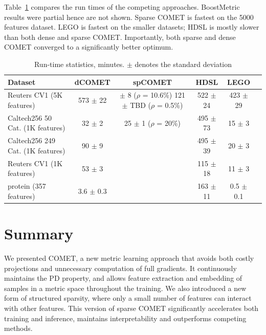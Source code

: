 \documentclass[twoside,11pt]{article}
\newcommand{\tabref}[1]{Table~\ref{#1}}
\begin{document}
\tabref{runtimes} compares the run times of the competing approaches. BoostMetric results were partial hence are not shown. Sparse COMET is fastest on the 5000 features dataset. LEGO is fastest on the smaller datasets; HDSL is mostly slower than both dense and sparse COMET. Importantly, both sparse and dense COMET converged to a significantly better optimum.


\begin{table}[t]
\captionsetup{font=small}
\caption{Run-time statistics, minutes. $\pm$ denotes the standard deviation}
\label{runtimes}
\vskip 0.15in
\begin{center}
\begin{small}
\begin{sc}
\begin{tabular}{lccccr}
\hline
Dataset     & dCOMET           & spCOMET            & HDSL             & LEGO            \\ 
\hline
Reuters CV1 (5K features)&  573 $\pm$    22 & \parbox[t]{3.5cm}{ $\pm$    8 ($\rho$ = 10.6\%)  \\ 121 $\pm$    TBD ($\rho$ = 0.5\%)} &522 $\pm$    24 &   423 $\pm$    29 & \\ 
Caltech256 50 Cat. (1K features)  &    32 $\pm$     2 &        25 $\pm$  1 ($\rho$ = 20\%)     &   495 $\pm$    73 &     15 $\pm$     3 &\\ 
Caltech256 249 Cat. (1K features) &   90 $\pm$     9 &                  &  495 $\pm$    39  &     20 $\pm$     3 &\\
Reuters CV1 (1K features) &   53 $\pm$     3 &                  &   115 $\pm$    18 &     11 $\pm$     3 &\\ 
protein (357 features)  &    3.6 $\pm$     0.3 &                  &   163 $\pm$    11 &      0.5 $\pm$     0.1 &\\ 
\hline
\end{tabular}
\end{sc}
\end{small}
\end{center}
\vskip -0.1in
\end{table}

\vspace{-6pt}
\section{Summary}\vskip -5pt
We presented COMET, a new metric learning approach that avoids both costly projections and unnecessary computation of full gradients. It continuously maintains the PD property, and allows feature extraction and embedding of samples in a metric space throughout the training. We also introduced a new form of structured sparsity, where only a small number of features can interact with other features. This version of sparse COMET significantly accelerates both training and inference, maintains interpretability and outperforms competing methods.
\end{document}
